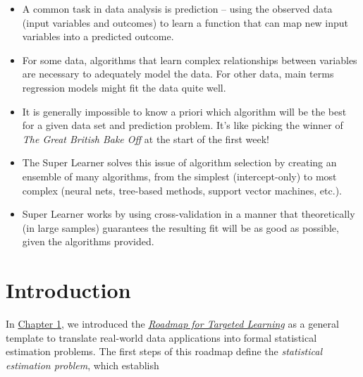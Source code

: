 \documentclass[
  12pt, krantz2,
]{krantz}
\providecommand{\tightlist}{%
  \setlength{\itemsep}{0pt}\setlength{\parskip}{0pt}}
\newcommand{\1}{\mathbbm{1}}
\theoremstyle{definition}
\theoremstyle{definition}
\theoremstyle{definition}
\theoremstyle{definition}
\theoremstyle{remark}
\begin{document}
\begin{itemize}
\tightlist
\item
  A common task in data analysis is prediction -- using the observed data (input
  variables and outcomes) to learn a function that can map new input variables
  into a predicted outcome.
\item
  For some data, algorithms that learn complex relationships between variables
  are necessary to adequately model the data. For other data, main terms
  regression models might fit the data quite well.
\item
  It is generally impossible to know a priori which algorithm will be the best
  for a given data set and prediction problem. It's like picking the winner of
  \emph{The Great British Bake Off} at the start of the first week!
\item
  The Super Learner solves this issue of algorithm selection by creating an
  ensemble of many algorithms, from the simplest (intercept-only) to most
  complex (neural nets, tree-based methods, support vector machines, etc.).
\item
  Super Learner works by using cross-validation in a manner that theoretically
  (in large samples) guarantees the resulting fit will be as good as possible,
  given the algorithms provided.
\end{itemize}

\hypertarget{introduction-2}{%
\section{Introduction}\label{introduction-2}}

In \protect\hyperlink{intro}{Chapter 1}, we introduced the \protect\hyperlink{roadmap}{\emph{Roadmap for Targeted
Learning}} as a general template to translate real-world data
applications into formal statistical estimation problems. The first steps of
this roadmap define the \emph{statistical estimation problem}, which establish
\end{document}
